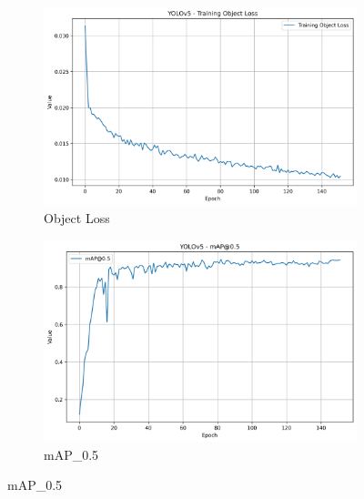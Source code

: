 \documentclass{article}
\begin{document}
\begin{figure}[h!]
  \begin{subfigure}[b]{0.495\textwidth}
    \centering
    \includegraphics[width=\linewidth]{img/Training Object Loss.png}
    \caption{Object Loss}
    \label{fig:objectloss}
  \end{subfigure}
  \begin{subfigure}[b]{0.495\textwidth}
    \centering
    \includegraphics[width=\linewidth]{img/mAP_0.5.png}
    \caption{mAP\_0.5}
    \label{fig:map}
  \end{subfigure}

  \vspace{0.6em}


\end{figure}
\end{document}
